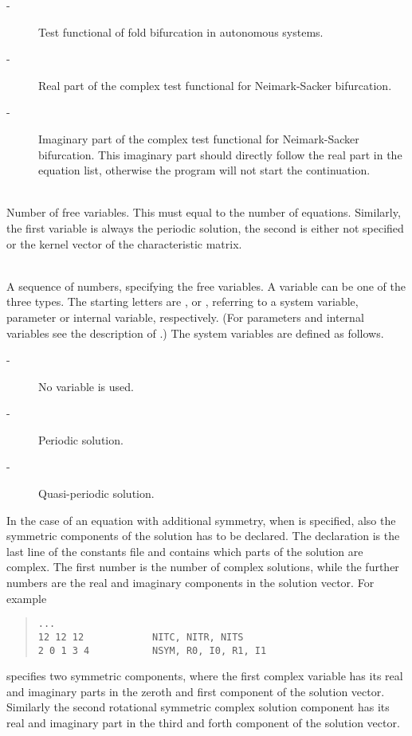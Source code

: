 \documentclass[10pt,a4paper]{ddedoc}
\begin{document}
\begin{description}
\begin{description}
\item[ -] Test functional of fold bifurcation in autonomous systems.
\item[ -] Real part of the complex test functional for Neimark-Sacker bifurcation.
\item[ -] Imaginary part of the complex test functional for Neimark-Sacker bifurcation. This imaginary part should directly follow the real part in the equation list, otherwise the program will not start the continuation.
\end{description}
\item[\funp{NVAR}] ~\\
	Number of free variables. This must equal to the number of equations. Similarly, the first variable is always the periodic solution, the second is either not specified or the kernel vector of the characteristic matrix.
\item[\funp{VAR}] ~\\
	A sequence of numbers, specifying the free variables. A variable can be one of the three types. The starting letters are ,  or , referring to a system variable, parameter or internal variable, respectively. (For parameters and internal variables see the description of .) The system variables are defined as follows.
\begin{description}
\item[ -] No variable is used.
\item[ -] Periodic solution.
\item[ -] Quasi-periodic solution.
\end{description}
In the case of an equation with additional symmetry, when  is specified, also the symmetric components of the solution has to be declared.
The declaration is the last line of the constants file and contains which parts of the solution are complex. The first number is the number of complex solutions,
while the further numbers are the real and imaginary components in the solution vector. For example
{ \small \begin{quote} \begin{lstlisting}[basicstyle=\tt,frame=single]
...
12 12 12            NITC, NITR, NITS
2 0 1 3 4           NSYM, R0, I0, R1, I1
\end{lstlisting} \end{quote} } \noindent
specifies two symmetric components, where the first complex variable has its real and imaginary parts in the zeroth and first component of the solution vector.
Similarly the second rotational symmetric complex solution component has its real and imaginary part in the third and forth component of the solution vector.
\end{description}
\end{document}
